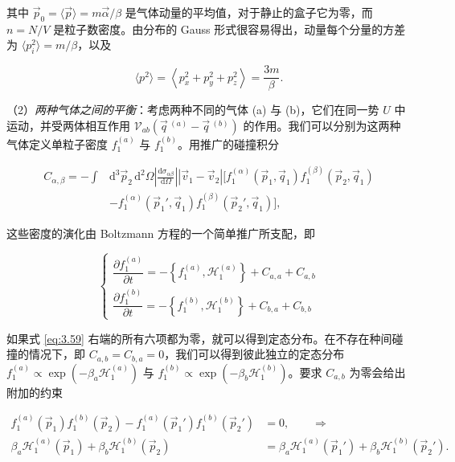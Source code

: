 其中 $\vec p_0=\langle\vec p\rangle=m\vec\alpha/\beta$ 是气体动量的平均值，对于静止的盒子它为零，而 $n=N/V$ 是粒子数密度。由分布的 Gauss 形式很容易得出，动量每个分量的方差为 $\langle p_i^2\rangle=m/\beta$，以及

\begin{equation}\label{eq:3.57}
  \langle p^2\rangle=\left\langle p_x^2+p_y^2+p_z^2\right\rangle=\frac{3m}{\beta}.
\end{equation}

（2）\emph{两种气体之间的平衡}：考虑两种不同的气体 (a) 与 (b)，它们在同一势 $U$ 中运动，并受两体相互作用 $\mathscr V_{ab}(\vec q\,^{(a)}-\vec q\,^{(b)})$ 的作用。我们可以分别为这两种气体定义单粒子密度 $f_1^{(a)}$ 与 $f_1^{(b)}$。用推广的碰撞积分

\begin{equation}\label{eq:3.58}
  \begin{aligned}
    C_{\alpha,\beta}=-\int &\mathrm{d}^3\vec p_2\,\mathrm{d}^2\Omega\left|\frac{\mathrm{d}\sigma_{\alpha\beta}}{\mathrm{d}\Omega}\right||\vec v_1-\vec v_2|\Big[f_1^{(\alpha)}(\vec p_1,\vec q_1)f_1^{(\beta)}(\vec p_2,\vec q_1)\\
    &-f_1^{(\alpha)}(\vec p_1{}',\vec q_1)f_1^{(\beta)}(\vec p_2{}',\vec q_1)\Big],
  \end{aligned}
\end{equation}

这些密度的演化由 Boltzmann 方程的一个简单推广所支配，即

\begin{equation}\label{eq:3.59}
  \begin{cases}
    \dfrac{\partial f_1^{(a)}}{\partial t}=-\left\{f_1^{(a)},\mathcal H_1^{(a)}\right\}+C_{a,a}+C_{a,b}\\[8pt]
    \dfrac{\partial f_1^{(b)}}{\partial t}=-\left\{f_1^{(b)},\mathcal H_1^{(b)}\right\}+C_{b,a}+C_{b,b}
  \end{cases}
\end{equation}

如果式 \eqref{eq:3.59} 右端的所有六项都为零，就可以得到定态分布。在不存在种间碰撞的情况下，即 $C_{a,b}=C_{b,a}=0$，我们可以得到彼此独立的定态分布 $f_1^{(a)}\propto\exp\left(-\beta_a\mathcal H_1^{(a)}\right)$ 与 $f_1^{(b)}\propto\exp\left(-\beta_b\mathcal H_1^{(b)}\right)$。要求 $C_{a,b}$ 为零会给出附加的约束

\begin{equation}\label{eq:3.60}
  \begin{aligned}
    f_1^{(a)}(\vec p_1)f_1^{(b)}(\vec p_2)-f_1^{(a)}(\vec p_1{}')f_1^{(b)}(\vec p_2{}')&=0,\qquad\Longrightarrow\\
    \beta_a\mathcal H_1^{(a)}(\vec p_1)+\beta_b\mathcal H_1^{(b)}(\vec p_2)&=\beta_a\mathcal H_1^{(a)}(\vec p_1{}')+\beta_b\mathcal H_1^{(b)}(\vec p_2{}').
  \end{aligned}
\end{equation}

